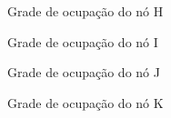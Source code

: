 \documentclass{llncs}
\begin{document}
\begin{figure}
	\centering
	\caption{Grade de ocupação do nó H}
	\label{fig:grade_no_H}
\end{figure}
\begin{figure}
	\centering
	\caption{Grade de ocupação do nó I}
	\label{fig:grade_no_I}
\end{figure}
\begin{figure}
	\centering
	\caption{Grade de ocupação do nó J}
	\label{fig:grade_no_J}
\end{figure}
\begin{figure}
	\centering
	\caption{Grade de ocupação do nó K}
	\label{fig:grade_no_K}
\end{figure}
\end{document}
